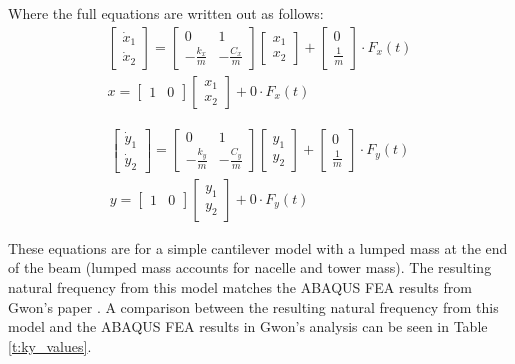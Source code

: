 Where the full equations are written out as follows:
\begin{align}
	\begin{bmatrix}
		\dot{x}_1 \\
		\dot{x}_2
	\end{bmatrix} = 		
	\left[\begin{matrix}0 & 1\\- \frac{k_{x}}{m} & - \frac{C_{x}}{m}\end{matrix}\right]
	\left[\begin{matrix}x_{1} \\ x_{2}\end{matrix}\right] +
	\left[\begin{matrix}0 \\ \frac{1}{m}\end{matrix}\right] \cdot F_x(t)\\
	x=
	\begin{bmatrix}
		1 & 0
	\end{bmatrix}
	\begin{bmatrix}
		x_1 \\ x_2		
	\end{bmatrix} + 0 \cdot F_x(t)
\end{align}

\begin{align}
	\begin{bmatrix}
		\dot{y}_1 \\
		\dot{y}_2
	\end{bmatrix} = 		
	\left[\begin{matrix}0 & 1\\- \frac{k_{y}}{m} & - \frac{C_{y}}{m}\end{matrix}\right]
	\left[\begin{matrix}y_{1} \\ y_{2}\end{matrix}\right] +
	\left[\begin{matrix}0 \\ \frac{1}{m}\end{matrix}\right] \cdot F_y(t)\\	
	y=
	\begin{bmatrix}
		1 & 0
	\end{bmatrix}
	\begin{bmatrix}
		y_1 \\ y_2		
	\end{bmatrix} + 0 \cdot F_y(t)	
\end{align}

These equations are for a simple cantilever model with a lumped mass at the end of the beam (lumped mass accounts for nacelle and tower mass).  The resulting natural frequency from this model matches the ABAQUS FEA results from Gwon's paper \cite{Gwon_paper}.  A comparison between the resulting natural frequency from this model and the ABAQUS FEA results in Gwon's analysis \cite{Gwon_paper} can be seen in Table \ref{t:ky_values}.